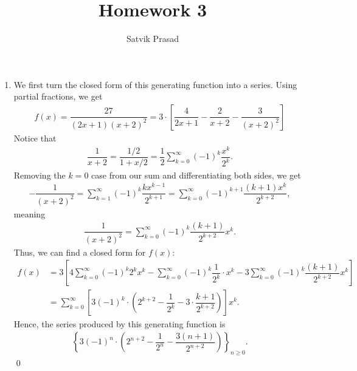 \documentclass[12pt]{article}
\title{Homework 3}
\author{Satvik Prasad}
\date{}
\begin{document}
\begin{enumerate}
  \item We first turn the closed form of this generating function
    into a series. Using partial fractions, we get
    \begin{align*}
      f(x) = \dfrac{27}{(2x+1)(x+2)^2} = 3 \cdot
      \left[\dfrac{4}{2x+1} - \dfrac{2}{x+2}- \dfrac{3}{(x+2)^2} \right]
    \end{align*}
    Notice that
    \begin{align*}
      \dfrac{1}{x+2} = \dfrac{1/2}{1 + x/2} = \dfrac{1}{2}\sum_{k =
      0}^{\infty} (-1)^k \dfrac{x^k}{2^k}.
    \end{align*}
    Removing the $k = 0$ case from our sum and differentiating both
    sides, we get
    \begin{align*}
      - \dfrac{1}{(x+2)^2} = \sum_{k = 1}^\infty (-1)^k
      \dfrac{kx^{k-1}}{2^{k+1}} = \sum_{k = 0}^{\infty} (-1)^{k + 1}
      \dfrac{(k+1)x^{k}}{2^{k + 2}},
    \end{align*}
    meaning
    \begin{align*}
      \dfrac{1}{(x+2)^2} = \sum_{k = 0}^{\infty} (-1)^k
      \dfrac{(k+1)}{2^{k + 2}} x^k.
    \end{align*}
    Thus, we can find a closed form for $f(x)$:
    \begin{align*}
      f(x) &= 3\left[
        4\sum_{k = 0}^{\infty} (-1)^k 2^k x^k -
        \sum_{k=0}^{\infty}(-1)^k \dfrac{1}{2^k}\cdot x^k - 3\sum_{k
        = 0}^{\infty} (-1)^k \dfrac{(k+1)}{2^{k+2}}x^k
      \right] \\
      &= \sum_{k = 0}^{\infty} \left[
        3(-1)^k \cdot \left(2^{k + 2} - \dfrac{1}{2^k} - 3\cdot
        \dfrac{k + 1}{2^{k + 2}} \right)
      \right] x^k.
    \end{align*}
    Hence, the series produced by this generating function is
    \begin{align*}
      \left\{3(-1)^n \cdot \left(
          2^{n + 2} - \dfrac{1}{2^n} - \dfrac{3(n + 1)}{2^{n + 2}}
      \right)\right\}_{n \geq 0}.
    \end{align*}
    \qed


\end{enumerate}
\end{document}
